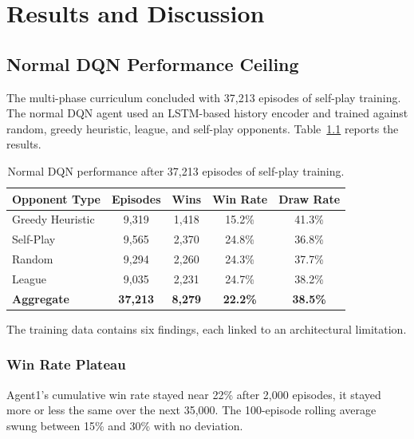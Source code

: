 \chapter{Results and Discussion}\label{chap:results}

\section{Normal DQN Performance Ceiling}

The multi-phase curriculum concluded with 37,213 episodes of self-play training. The normal DQN agent used an LSTM-based history encoder and trained against random, greedy heuristic, league, and self-play opponents. Table~\ref{tab:vanilla_performance} reports the results.

\begin{table}[htbp]
    \centering
    \caption{Normal DQN performance after 37,213 episodes of self-play training.}
    \label{tab:vanilla_performance}
    \begin{tabular}{|l|c|c|c|c|}
        \hline
        \textbf{Opponent Type} & \textbf{Episodes} & \textbf{Wins} & \textbf{Win Rate} & \textbf{Draw Rate} \\
        \hline
        Greedy Heuristic & 9,319 & 1,418 & 15.2\% & 41.3\% \\
        Self-Play        & 9,565 & 2,370 & 24.8\% & 36.8\% \\
        Random           & 9,294 & 2,260 & 24.3\% & 37.7\% \\
        League           & 9,035 & 2,231 & 24.7\% & 38.2\% \\
        \hline
        \textbf{Aggregate} & \textbf{37,213} & \textbf{8,279} & \textbf{22.2\%} & \textbf{38.5\%} \\
        \hline
    \end{tabular}
\end{table}

The training data contains six findings, each linked to an architectural limitation.

\subsection{Win Rate Plateau}\label{finding:1}
Agent1's cumulative win rate stayed near 22\% after 2,000 episodes, it stayed more or less the same over the next 35,000. The 100-episode rolling average swung between 15\% and 30\% with no deviation.

